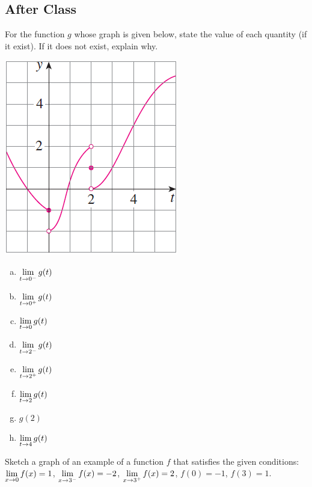 \documentclass[notes]{subfiles}
\begin{document}
	\subsection*{After Class}
		\begin{ex}
			For the function $g$ whose graph is given below, state the value of each quantity (if it exist).  If it does not exist, explain why.\\
			\begin{minipage}{.4\textwidth}
				\includegraphics{1.5fig1}
			\end{minipage}
			\begin{minipage}{.45\textwidth}
				\begin{multicols*}{2}
					\begin{enumerate}[(a)]
						\setlength\itemsep{.75in}
							\item $\displaystyle \lim_{t\to 0^-} g(t)$ 
							\item $\displaystyle \lim_{t\to 0^+} g(t)$
							\item $\displaystyle \lim_{t\to 0} g(t)$
							\item $\displaystyle \lim_{t\to 2^-} g(t)$
								\columnbreak
							\item $\displaystyle \lim_{t\to 2^+} g(t)$
							\item $\displaystyle \lim_{t\to 2} g(t)$
							\item $g(2)$
							\item $\displaystyle \lim_{t\to 4} g(t)$
							\raggedcolumns
					\end{enumerate}
				\end{multicols*}
			\end{minipage}
		\end{ex}
			\vs{1}
		\begin{ex}
			Sketch a graph of an example of a function $f$ that satisfies the given conditions: $\displaystyle \lim_{x\to 0} f(x) = 1$, $\displaystyle \lim_{x\to 3^-} f(x) = -2$, $\displaystyle \lim_{x\to 3^+} f(x) = 2$, $f(0) = -1$, $f(3) = 1$.
		\end{ex}
			\newpage 
			
\end{document}
